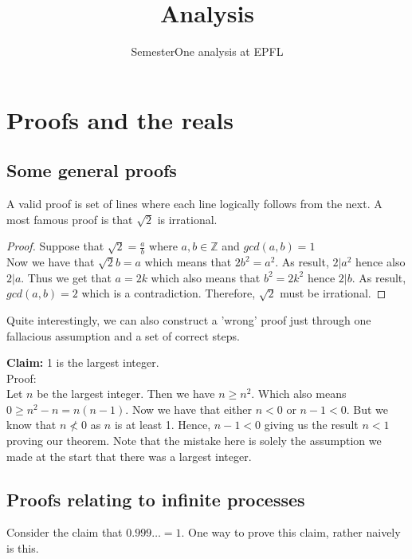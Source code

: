 \documentclass{article}
\title{Analysis}
\author{SemesterOne analysis at EPFL}
\date{\vspace{-5ex}}
\begin{document}
\maketitle

\section{Proofs and the reals}
\subsection{Some general proofs}
A valid proof is set of lines where each line logically follows from the next. 
A most famous proof is that $\sqrt{2} $ is irrational. 

\begin{tcolorbox}
\begin{proof}
	Suppose that $\sqrt{2} = \frac{a}{b}$ where $a,b \in \mathbb{Z}$ and $gcd(a,b) = 1$
	\\
	Now we have that $\sqrt{2}b = a$ which means that $2b^2 = a^2$.
	As result, $2 \vert a^2$ hence also $2 \vert a$. Thus we get that $a = 2k$ which also means that $b^2 = 2k^2$ hence $2 \vert b$. As result, $gcd(a,b) = 2$ which is a contradiction. Therefore, $\sqrt{2}$ must be irrational. 
	\end{proof}
\end{tcolorbox}

Quite interestingly, we can also construct a 'wrong' proof just through one fallacious assumption and a set of correct steps. 

\begin{tcolorbox}
    \textbf{Claim:} 1 is the largest integer.
    \\
    Proof: 
    \\
    Let $n$ be the largest integer. Then we have $n \geq n^2$. Which also means $0 \geq n^2 - n = n(n-1)$. Now we have that either $n < 0$ or $n - 1 < 0$. But we know that $ n \nless 0$ as $n$ is at least 1. Hence, $n - 1 < 0$ giving us the result $n < 1$ proving our theorem. Note that the mistake here is solely the assumption we made at the start that there was a largest integer. 
\end{tcolorbox}
\subsection{Proofs relating to infinite processes}
Consider the claim that $0.999\ldots = 1$.
One way to prove this claim, rather naively is this.
\end{document}
